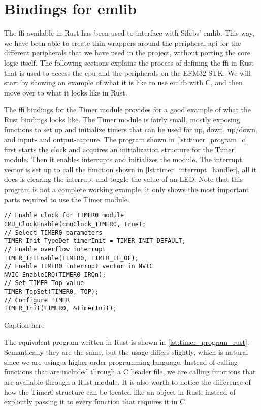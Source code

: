 
\section{Bindings for emlib} %
\label{sub:interfacing_with_emlib}

The \gls{ffi} available in Rust has been used to interface with Silabs' emlib.
This way, we have been able to create thin wrappers around the peripheral \gls{api} for the different peripherals that we have used in the project, without porting the core logic itself.
The following sections explains the process of defining the \gls{ffi} in Rust that is used to access the \gls{cpu} and the peripherals on the EFM32 STK. We will start by showing an example of what it is like to use emlib with C, and then move over to what it looks like in Rust.

The \gls{ffi} bindings for the Timer module \cite{an0014_timer} provides for a good example of what the Rust bindings looks like.
The Timer module is fairly small, mostly exposing functions to set up and initialize timers that can be used for up, down, up/down, and input- and output-capture.
The program shown in \autoref{lst:timer_program_c} first starts the clock and acquires an initialization structure for the Timer module. Then it enables interrupts and initializes the module.
The interrupt vector is set up to call the function shown in \autoref{lst:timer_interrupt_handler}, all it does is clearing the interrupt and toggle the value of an LED. Note that this program is not a complete working example, it only shows the most important parts required to use the Timer module.

\begin{listing}[tb]
\begin{verbatim}
// Enable clock for TIMER0 module
CMU_ClockEnable(cmuClock_TIMER0, true);
// Select TIMER0 parameters
TIMER_Init_TypeDef timerInit = TIMER_INIT_DEFAULT;
// Enable overflow interrupt
TIMER_IntEnable(TIMER0, TIMER_IF_OF);
// Enable TIMER0 interrupt vector in NVIC
NVIC_EnableIRQ(TIMER0_IRQn);
// Set TIMER Top value
TIMER_TopSet(TIMER0, TOP);
// Configure TIMER
TIMER_Init(TIMER0, &timerInit);
\end{verbatim}
\caption{Caption here}
\label{lst:timer_program_c}
\end{listing}

The equivalent program written in Rust is shown in \autoref{lst:timer_program_rust}.
Semantically they are the same, but the usage differs slightly, which is natural since we are using a higher-order programming language.
Instead of calling functions that are included through a C header file, we are calling functions that are available through a Rust module. It is also worth to notice the difference of how the Timer0 structure can be treated like an object in Rust, instead of explicitly passing it to every function that requires it in C.


